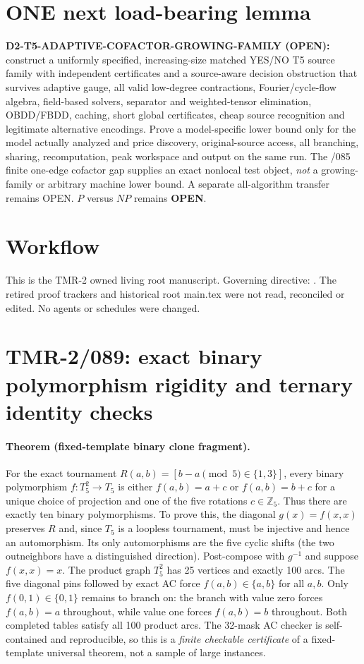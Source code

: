 \documentclass[11pt]{article}
\begin{document}
\section{ONE next load-bearing lemma}
\textbf{D2-T5-ADAPTIVE-COFACTOR-GROWING-FAMILY (OPEN):}
construct a uniformly specified, increasing-size matched
YES/NO T5 source family with independent certificates and a
source-aware decision obstruction that survives adaptive gauge,
all valid low-degree contractions, Fourier/cycle-flow algebra,
field-based solvers, separator and weighted-tensor elimination,
OBDD/FBDD, caching, short global certificates, cheap source
recognition and legitimate alternative encodings. Prove a
model-specific lower bound only for the model actually analyzed
and price discovery, original-source access, all branching,
sharing, recomputation, peak workspace and output on the same
run. The /085 finite one-edge cofactor gap supplies an exact
nonlocal test object, \emph{not} a growing-family or arbitrary
machine lower bound. A separate all-algorithm transfer remains
OPEN. $P$ versus $NP$ remains \textbf{OPEN}.

\section{Workflow}
This is the TMR-2 owned living root manuscript. Governing directive: . The retired proof trackers and historical root main.tex were not read, reconciled or edited. No agents or schedules were changed.

\section{TMR-2/089: exact binary polymorphism rigidity and ternary identity checks}
\paragraph{Theorem (fixed-template binary clone fragment).}
For the exact tournament
$R(a,b)=[b-a\pmod5\in\{1,3\}]$, every binary polymorphism
$f:T_5^2\to T_5$ is either $f(a,b)=a+c$ or $f(a,b)=b+c$ for a unique
choice of projection and one of the five rotations $c\in\mathbb Z_5$.
Thus there are exactly ten binary polymorphisms.
To prove this, the diagonal $g(x)=f(x,x)$ preserves $R$ and, since
$T_5$ is a loopless tournament, must be injective and hence an
automorphism. Its only automorphisms are the five cyclic shifts
(the two outneighbors have a distinguished direction).
Post-compose with $g^{-1}$ and suppose $f(x,x)=x$.
The product graph $T_5^2$ has 25 vertices and exactly 100 arcs.
The five diagonal pins followed by exact AC force
$f(a,b)\in\{a,b\}$ for all $a,b$. Only
$f(0,1)\in\{0,1\}$ remains to branch on: the branch with value
zero forces $f(a,b)=a$ throughout, while value one forces
$f(a,b)=b$ throughout. Both completed tables satisfy all 100
product arcs. The 32-mask AC checker is self-contained and
reproducible, so this is a \emph{finite checkable certificate} of a
fixed-template universal theorem, not a sample of large instances.
\end{document}
